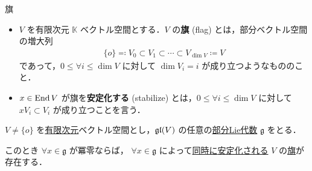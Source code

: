 \documentclass[rep_main]{subfiles}
\begin{document}
\begin{mydef}[label=def:flag]{旗}
    \begin{itemize}
        \item $V$ を有限次元 $\mathbb{K}$ ベクトル空間とする．$V$ の\textbf{旗} (flag) とは，部分ベクトル空間の増大列
        \begin{align}
            \{o\} \eqqcolon V_0 \subset V_1 \subset \cdots \subset V_{\dim V} \coloneqq V
        \end{align}
        であって，$0 \le \forall i \le \dim V$ に対して $\dim V_i = i$ が成り立つようなもののこと．

        \item $x \in \operatorname{End} V$ が旗を\textbf{安定化する} (stabilize) とは，$0 \le \forall i \le \dim V$ に対して $x V_i \subset V_i$ が成り立つことを言う．
    \end{itemize}
\end{mydef}

\begin{mycol}[label=col:Engel-flag]{}
    $V \neq \{o\}$ を\underline{有限次元}ベクトル空間とし，$\mathfrak{gl} (V)$ の任意の\hyperref[def:subLieAlg]{部分Lie代数} $\mathfrak{g}$ をとる．

    このとき $\forall x \in \mathfrak{g}$ が冪零ならば， $\forall x \in \mathfrak{g}$ によって\underline{同時に}\hyperref[def:flag]{安定化される} $V$ の\hyperref[def:flag]{旗}が存在する．
\end{mycol}
\end{document}
